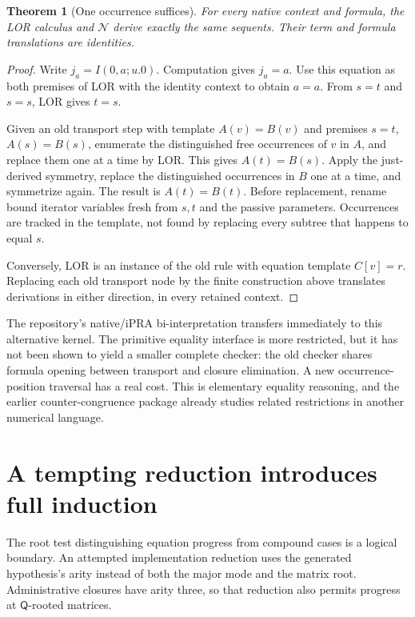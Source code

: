 \documentclass[11pt,letterpaper]{article}
\newtheorem{theorem}{Theorem}[section]
\theoremstyle{definition}\newtheorem{definition}[theorem]{Definition}
\theoremstyle{remark}\newtheorem{remark}[theorem]{Remark}
\newcommand{\Ncal}{\mathcal N}
\newcommand{\Q}{\mathsf Q}
\begin{document}
\begin{theorem}[One occurrence suffices]
For every native context and formula, the LOR calculus and $\Ncal$ derive
exactly the same sequents. Their term and formula translations are identities.
\end{theorem}
\begin{proof}
Write $j_a=I(0,a;u.0)$. Computation gives $j_a=a$. Use this equation as
both premises of LOR with the identity context to obtain $a=a$.
From $s=t$ and $s=s$, LOR gives $t=s$.

Given an old transport step with template $A(v)=B(v)$ and premises
$s=t$, $A(s)=B(s)$, enumerate the distinguished free occurrences of $v$
in $A$, and replace them one at a time by LOR. This gives $A(t)=B(s)$.
Apply the just-derived symmetry, replace the distinguished occurrences in
$B$ one at a time, and symmetrize again. The result is $A(t)=B(t)$.
Before replacement, rename bound iterator variables fresh from $s,t$ and
the passive parameters. Occurrences are tracked in the template, not found
by replacing every subtree that happens to equal $s$.

Conversely, LOR is an instance of the old rule with equation template
$C[v]=r$. Replacing each old transport node by the finite construction
above translates derivations in either direction, in every retained context.
\end{proof}

The repository's native/iPRA bi-interpretation transfers immediately to
this alternative kernel. The primitive equality interface is more
restricted, but it has not been shown to yield a smaller complete checker:
the old checker shares formula opening between transport and closure
elimination. A new occurrence-position traversal has a real cost. This is
elementary equality reasoning, and the earlier counter-congruence package
already studies related restrictions in another numerical language.

\section{A tempting reduction introduces full induction}
\label{sec:barrier}

The root test distinguishing equation progress from compound cases is a
logical boundary. An attempted implementation reduction uses the generated
hypothesis's arity instead of both the major mode and the matrix root.
Administrative closures have arity three, so that reduction also permits
progress at $\Q$-rooted matrices.
\end{document}
